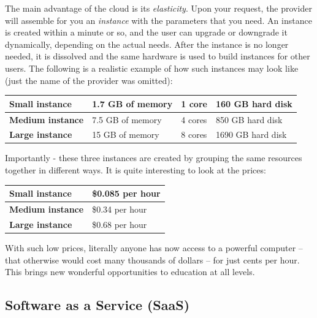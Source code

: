 \documentclass[article,A4,12pt]{llncs}
\begin{document}
The main advantage of the cloud is its {\em elasticity}. Upon your request, the
provider will assemble for you an {\em instance} with the parameters that 
you need. An instance is created within a minute or so, and the user can upgrade 
or downgrade it dynamically, depending on the actual needs. After the instance is 
no longer needed, it is dissolved and the same hardware is used to build instances 
for other users. The following is a realistic example of how such instances may 
look like (just the name of the provider was omitted):\\

\begin{center}
\begin{tabular}{|l|l|l|l|}
\hline
{\bf Small instance} & 1.7 GB of memory & 1 core & 160 GB hard disk \\
\hline
{\bf Medium instance} & 7.5 GB of memory & 4 cores & 850 GB hard disk \\
\hline
{\bf Large instance} & 15 GB of memory & 8 cores & 1690 GB hard disk \\
\hline
\end{tabular}
\end{center}

\vspace{4mm}
\noindent
Importantly - these three instances are created by grouping the same resources together 
in different ways. 
It is quite interesting to look at the prices:

\begin{center}
\begin{tabular}{|l|l|}
\hline
{\bf Small instance} &	\$0.085 per hour\\
\hline
{\bf Medium instance}&	\$0.34 per hour	\\
\hline
{\bf Large instance}&	\$0.68 per hour\\
\hline
\end{tabular}
\end{center}

\vspace{4mm}
\noindent
With such low prices, literally anyone has now access to 
a powerful computer -- that otherwise would cost many thousands of dollars -- 
for just cents per hour. This brings new wonderful opportunities to 
education at all levels.

\subsection{Software as a Service (SaaS)}
\end{document}
